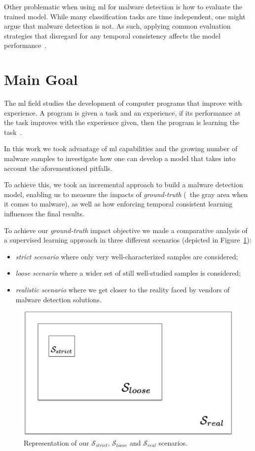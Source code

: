 Other problematic when using \gls{ml} for malware detection is how to evaluate the trained model.
While many classification tasks are time independent, one might argue that malware detection is not.
As such, applying common evaluation strategies that disregard for any temporal consistency affects the model performance~\cite{deo2016prescience,jordaney2017transcend,rossow:practices}.


\section{Main Goal}
\label{section:overview}

The \acrfull{ml} field studies the development of computer programs that improve with experience.
A program is given a task and an experience, if its performance at the task improves with the experience given, then the program is learning the task~\cite{mitchell:ml}.

In this work we took advantage of \gls{ml} capabilities and the growing number of malware samples to investigate how one can develop a model that takes into account the aforementioned pitfalls.

To achieve this, we took an incremental approach to build a malware detection model, enabling us to measure the impacts of \textit{ground-truth} (\ie\ the gray area when it comes to malware), as well as how enforcing temporal consistent learning influences the final results.

To achieve our \textit{ground-truth} impact objective we made a comparative analysis of a supervised learning approach in three different scenarios (depicted in Figure~\ref{fig:scenarios}): 

\begin{itemize}
	\item \emph{strict scenario} where only very well-characterized samples are considered;
	\item \emph{loose scenario} where a wider set of still well-studied samples is considered;
	\item \emph{realistic scenario} where we get closer to the reality faced by vendors of malware detection solutions.
\end{itemize}

\begin{figure}[!h]
	\centering
	\includegraphics[width=0.7\columnwidth]{Figures/dataset_sizes.png}
	\caption{Representation of our $\mathcal{S}_{strict}$, $\mathcal{S}_{loose}$ and $\mathcal{S}_{real}$ scenarios.}
	\label{fig:scenarios}
\end{figure}

